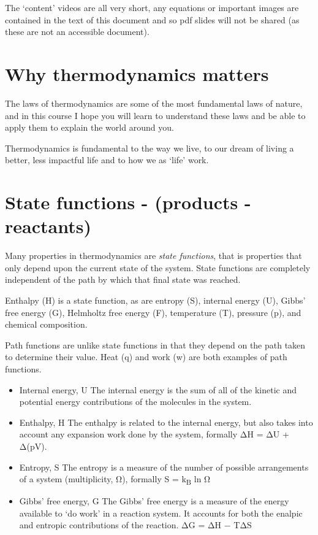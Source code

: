\documentclass[
]{book}
\begin{document}
The `content' videos are all very short, any equations or important images are contained in the text of this document and so pdf slides will not be shared (as these are not an accessible document).

\hypertarget{sec:whyjustwhy}{%
\section{Why thermodynamics matters}\label{sec:whyjustwhy}}

The laws of thermodynamics are some of the most fundamental laws of nature, and in this course I hope you will learn to understand these laws and be able to apply them to explain the world around you.

Thermodynamics is fundamental to the way we live, to our dream of living a better, less impactful life and to how we as `life' work.

\hypertarget{sec:state}{%
\section{State functions - (products - reactants)}\label{sec:state}}

Many properties in thermodynamics are \emph{state functions}, that is properties that only depend upon the current state of the system. State functions are completely independent of the path by which that final state was reached.

Enthalpy (H) is a state function, as are entropy (S), internal energy (U), Gibbs' free energy (G), Helmholtz free energy (F), temperature (T), pressure (p), and chemical composition.

Path functions are unlike state functions in that they depend on the path taken to determine their value.
Heat (q) and work (w) are both examples of path functions.

\begin{itemize}
\item
  Internal energy, U The internal energy is the sum of all of the kinetic and potential energy contributions of the molecules in the system.
\item
  Enthalpy, H The enthalpy is related to the internal energy, but also takes into account any expansion work done by the system, formally ΔH = ΔU + Δ(pV).
\item
  Entropy, S The entropy is a measure of the number of possible arrangements of a system (multiplicity, Ω), formally S = k\textsubscript{B} ln Ω
\item
  Gibbs' free energy, G The Gibbs' free energy is a measure of the energy available to `do work' in a reaction system. It accounts for both the enalpic and entropic contributions of the reaction. ΔG = ΔH − TΔS
\end{itemize}
\end{document}
